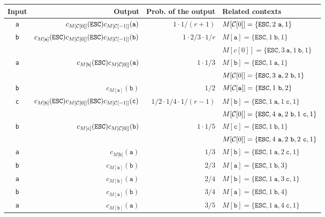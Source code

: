   \begin{tabular}{crrl}
    Input & Output & Prob. of the output & Related contexts\\
    \hline
    {\tt a} & $c_{M[{\cal C}[0]]}(\mathtt{ESC})c_{M[{\cal C}[-1]]}(\mathtt{a})$ & $1\cdot 1/(r+1)$ & $M[{\cal C}[0]]=\{\mathtt{ESC},2~\mathtt{a},1\}$\\
    {\tt b} & $c_{M[\texttt{a}]}(\mathtt{ESC})c_{M[{\cal C}[0]]}(\mathtt{ESC})c_{M[{\cal C}[-1]]}(\mathtt{b})$ & $1\cdot 2/3\cdot 1/r$ & $M[\mathtt{a}]=\{\mathtt{ESC},1~\mathtt{b},1\}$\\
    ~       & & & $M[c[0]]=\{\mathtt{ESC},3~\mathtt{a},1~\mathtt{b},1\}$\\
    {\tt a} & $c_{M[\texttt{b}]}(\mathtt{ESC})c_{M[{\cal C}[0]]}(\mathtt a)$ & $1\cdot 1/3$ & $M[\mathtt{b}]=\{\mathtt{ESC},1~\mathtt{a},1\}$\\
    ~       & & & $M[{\cal C}[0]]=\{\mathtt{ESC},3~\mathtt{a},2~\mathtt{b},1\}$\\
    {\tt b} & $c_{M[\mathtt{a}]}(\mathtt b)$ & $1/2$ & $M[{\cal C}[\mathtt{a}]]=\{\mathtt{ESC},1~\mathtt{b},2\}$\\
    {\tt c} & $c_{M[\mathtt{b}]}(\mathtt{ESC})c_{M[{\cal C}[0]]}(\mathtt{ESC})c_{M[{\cal C}[-1]]}(\mathtt c)$ & $1/2\cdot 1/4\cdot 1/(r-1)$ & $M[\mathtt{b}]=\{\mathtt{ESC},1~\mathtt{a},1~\mathtt{c},1\}$\\
    ~       & & & $M[{\cal C}[0]]=\{\mathtt{ESC},4~\mathtt{a},2~\mathtt{b},1~\mathtt{c},1\}$\\
    {\tt b} & $c_{M[\texttt{c}]}(\mathtt{ESC})c_{M[{\cal C}[0]]}(\mathtt b)$ & $1\cdot 1/5$ & $M[\mathtt{c}]=\{\mathtt{ESC},1~\mathtt{b},1\}$\\
    ~       & & & $M[{\cal C}[0]]=\{\mathtt{ESC},4~\mathtt{a},2~\mathtt{b},2~\mathtt{c},1\}$\\ 
    {\tt a} & $c_{M[\mathtt{b]}}(\mathtt a)$ & $1/3$ & $M[\mathtt{b}]=\{\mathtt{ESC},1~\mathtt{a},2~\mathtt{c},1\}$\\
    {\tt b} & $c_{M[\mathtt{a}]}(\mathtt b)$ & $2/3$ & $M[\mathtt{a}]=\{\mathtt{ESC},1~\mathtt{b},3\}$\\
    {\tt a} & $c_{M[\mathtt{b}]}(\mathtt a)$ & $2/4$ & $M[\mathtt{b}]=\{\mathtt{ESC},1~\mathtt{a},3~\mathtt{c},1\}$\\
    {\tt b} & $c_{M[\mathtt{a}]}(\mathtt b)$ & $3/4$ & $M[\mathtt{a}]=\{\mathtt{ESC},1~\mathtt{b},4\}$\\
    {\tt a} & $c_{M[\mathtt{b}]}(\mathtt a)$ & $3/5$ & $M[\mathtt{b}]=\{\mathtt{ESC},1~\mathtt{a},4~\mathtt{c},1\}$\\

\end{tabular}
